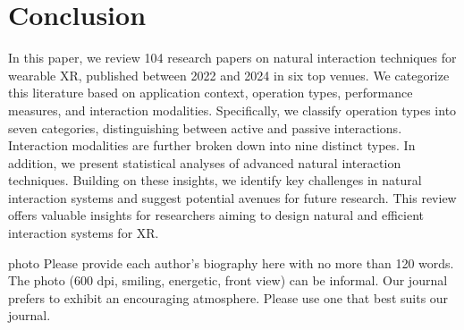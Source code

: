 \documentclass[review]{fcs}
\begin{document}
\section{Conclusion}

In this paper, we review 104 research papers on natural interaction techniques for wearable XR, published between 2022 and 2024 in six top venues. We categorize this literature based on application context, operation types, performance measures, and interaction modalities. 
Specifically, we classify operation types into seven categories, distinguishing between active and passive interactions. Interaction modalities are further broken down into nine distinct types. In addition, we present statistical analyses of advanced natural interaction techniques. Building on these insights, we identify key challenges in natural interaction systems and suggest potential avenues for future research.
This review offers valuable insights for researchers aiming to design natural and efficient interaction systems for XR.







\begin{biography}{photo}
Please provide each author's biography here with no more than 120 words. The photo (600 dpi, smiling, energetic, front view) can be informal. Our journal prefers to exhibit an encouraging atmosphere. Please use one that best suits our journal.
\end{biography}
\end{document}
